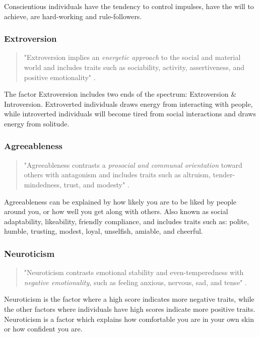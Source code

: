 Conscientious individuals have the tendency to control impulses, have the will to achieve, are hard-working and rule-followers.

\subsubsection{Extroversion}
\begin{quote}
    "Extroversion implies an \textit{energetic approach} to the social and material world and includes traits such as sociability, activity, assertiveness, and positive emotionality" \citep[p.121]{John1999}.

\end{quote}

The factor Extroversion includes two ends of the spectrum: Extroversion \& Introversion. Extroverted individuals draws energy from interacting with people, while introverted individuals will become tired from social interactions and draws energy from solitude.

\subsubsection{Agreeableness}
\begin{quote}
    "Agreeableness contrasts a \textit{prosocial and communal orientation} toward others with antagonism and includes traits such as altruism, tender-mindedness, trust, and modesty" \citep[p.121]{John1999}.
\end{quote}

Agreeableness can be explained by how likely you are to be liked by people around you, or how well you get along with others. Also known as social adaptability, likeability, friendly compliance, and includes traits such as: polite, humble, trusting, modest, loyal, unselfish, amiable, and cheerful.

\subsubsection{Neuroticism}
\begin{quote}
    "Neuroticism contrasts emotional stability and even-temperedness with \textit{negative emotionality}, such as feeling anxious, nervous, sad, and tense" \citep[p.121]{John1999}.
\end{quote}

Neuroticism is the factor where a high score indicates more negative traits, while the other factors where individuals have high scores indicate more positive traits. Neuroticism is a factor which explains how comfortable you are in your own skin or how confident you are.

